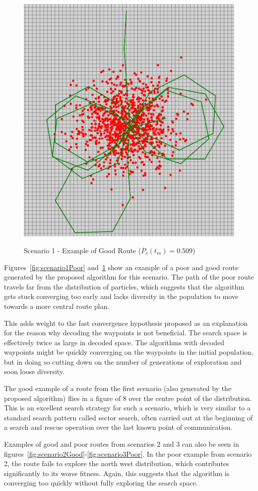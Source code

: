 \documentclass[10pt,a4paper, oneside, conference]{IEEEtran}
\begin{document}
\begin{figure}[H]
	\caption{Scenario 1 - Example of Good Route ($\overline{P}_s(t_m)=0.509$)}
	\includegraphics[width=0.6\linewidth]{goodRouteScenario1.png}
	\centering
	\label{fig:scenario1Good}	
	\end{figure}

Figures~\ref{fig:scenario1Poor} and~\ref{fig:scenario1Good} show an example of a poor and good route generated by the proposed algorithm for this scenario. 
The path of the poor route travels far from the distribution of particles, which suggests that the algorithm gets stuck converging too early and lacks diversity in the population to move towards a more central route plan.

This adds weight to the fast convergence hypothesis proposed as an explanation for the reason why decoding the waypoints is not beneficial.
The search space is effectively twice as large in decoded space. The algorithms with decoded waypoints might be quickly converging on the waypoints in the initial population, but in doing so cutting down on the number of generations of exploration and soon loose diversity.

The good example of a route from the first scenario (also generated by the proposed algorithm) flies in a figure of 8 over the centre point of the distribution.
This is an excellent search strategy for such a scenario, which is very similar to a standard search pattern called sector search, often carried out at the beginning of a search and rescue operation over the last known point of communication.

Examples of good and poor routes from scenarios 2 and 3 can also be seen in figures~\ref{fig:scenario2Good}-\ref{fig:scenario3Poor}. In the poor example from scenario 2, the route fails to explore the north west distribution, which contributes significantly to its worse fitness.
Again, this suggests that the algorithm is converging too quickly without fully exploring the search space.
\end{document}
